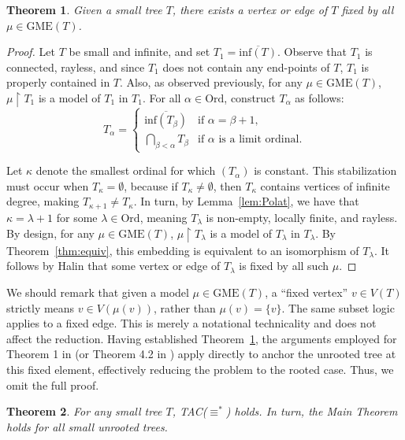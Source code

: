 \documentclass[12pt]{amsart}
\newtheorem{theorem}{Theorem}[section]
\numberwithin{mytheorem}{section} %
\numberwithin{mylemma}{section} %
\numberwithin{mycorollary}{section} %
\begin{document}
\begin{theorem}\label{thm:fixed} Given a small tree $T$, there exists a vertex or edge of $T$ fixed by all $\mu \in \text{GME}(T)$.
\end{theorem}
\begin{proof}
Let $T$ be small and infinite, and set $T_1 = \overline{\text{inf}(T)}$. Observe that $T_1$ is connected, rayless, and since $T_1$ does not contain any end-points of $T$, $T_1$ is properly contained in $T$. Also, as observed previously, for any $\mu \in \text{GME}(T)$, $\mu\restriction T_1$ is a model of $T_1$ in $T_1$. For all $\alpha \in \text{Ord}$, construct $T_\alpha$ as follows:
$$
T_\alpha =
\begin{cases}
\overline{\text{inf}(T_\beta)} & \text{if } \alpha = \beta + 1, \\
\bigcap_{\beta < \alpha} T_\beta & \text{if } \alpha \text{ is a limit ordinal.}
\end{cases}
$$

Let $\kappa$ denote the smallest ordinal for which $(T_\alpha)$ is constant. This stabilization must occur when $T_\kappa = \emptyset$, because if $T_\kappa \neq \emptyset$, then $T_\kappa$ contains vertices of infinite degree, making $T_{\kappa +1} \neq T_\kappa$. In turn, by Lemma~\ref{lem:Polat}, we have that $\kappa = \lambda +1$ for some $\lambda \in \text{Ord}$, meaning $T_\lambda$ is non-empty, locally finite, and rayless. By design, for any $\mu\in \text{GME}(T)$, $\mu\restriction T_\lambda$ is a model of $T_\lambda$ in $T_\lambda$. By Theorem~\ref{thm:equiv}, this embedding is equivalent to an isomorphism of $T_\lambda$. It follows by Halin \cite{H} that some vertex or edge of $T_\lambda$ is fixed by all such $\mu$.
\end{proof}

We should remark that given a model $\mu \in \text{GME}(T)$, a ``fixed vertex'' $v \in V(T)$ strictly means $v \in V(\mu(v))$, rather than $\mu(v) = \{v\}$. The same subset logic applies to a fixed edge. This is merely a notational technicality and does not affect the reduction. Having established Theorem~\ref{thm:fixed}, the arguments employed for Theorem 1 in \cite{A} (or Theorem 4.2 in \cite{BP1}) apply directly to anchor the unrooted tree at this fixed element, effectively reducing the problem to the rooted case. Thus, we omit the full proof.

\begin{theorem} For any small tree $T$, TAC($\equiv^*$) holds. In turn, the Main Theorem holds for all small unrooted trees.
\end{theorem}
\end{document}
